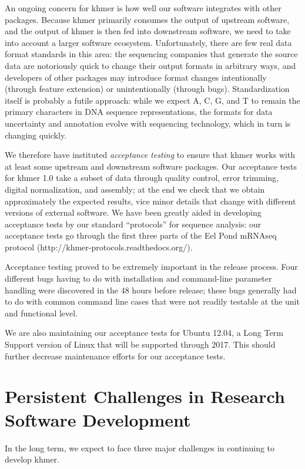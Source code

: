 \documentclass[11pt]{article}
\begin{document}
An ongoing concern for khmer is how well our software integrates with
other packages.  Because khmer primarily consumes the output of
upstream software, and the output of khmer is then fed into downstream
software, we need to take into account a larger software ecosystem.
Unfortunately, there are few real data format standards in this area:
the sequencing companies that generate the source data are notoriously
quick to change their output formats in arbitrary ways, and developers
of other packages may introduce format changes intentionally (through
feature extension) or unintentionally (through bugs).  Standardization
itself is probably a futile approach: while we expect A, C, G, and
T to remain the primary characters in DNA sequence representations,
the formats for data uncertainty and annotation evolve with
sequencing technology, which in turn is changing quickly.

We therefore have instituted {\em acceptance testing} to ensure that
khmer works with at least some upstream and downstream software
packages.  Our acceptance tests for khmer 1.0 take a subset of data
through quality control, error trimming, digital normalization, and
assembly; at the end we check that we obtain approximately the
expected results, vice minor details that change with different
versions of external software.  We have been greatly aided in
developing acceptance tests by our standard ``protocols'' for sequence
analysis: our acceptance tests go through the first three parts of the
Eel Pond mRNAseq protocol (http://khmer-protocols.readthedocs.org/).

Acceptance testing proved to be extremely important in the release
process.  Four different bugs having to do with installation and
command-line parameter handling were discovered in the 48 hours before
release; these bugs generally had to do with common command line cases
that were not readily testable at the unit and functional level.

We are also maintaining our acceptance tests for Ubuntu 12.04, a Long
Term Support version of Linux that will be supported through 2017.
This should further decrease maintenance efforts for our acceptance
tests.

\section{Persistent Challenges in Research Software Development}

In the long term, we expect to face three major challenges in continuing
to develop khmer.
\end{document}
